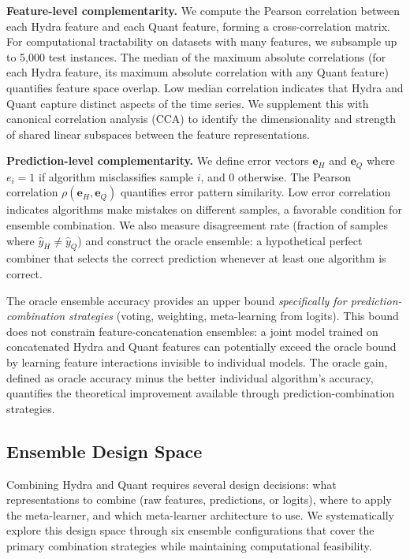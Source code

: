 \documentclass[pdflatex,sn-basic]{sn-jnl}           %
\theoremstyle{thmstyleone}%
\theoremstyle{thmstyletwo}%
\theoremstyle{thmstylethree}%
\begin{document}
\textbf{Feature-level complementarity.} We compute the Pearson correlation between each Hydra feature and each Quant feature, forming a cross-correlation matrix. For computational tractability on datasets with many features, we subsample up to 5,000 test instances. The median of the maximum absolute correlations (for each Hydra feature, its maximum absolute correlation with any Quant feature) quantifies feature space overlap. Low median correlation indicates that Hydra and Quant capture distinct aspects of the time series. We supplement this with canonical correlation analysis (CCA) to identify the dimensionality and strength of shared linear subspaces between the feature representations.

\textbf{Prediction-level complementarity.} We define error vectors $\mathbf{e}_H$ and $\mathbf{e}_Q$ where $e_i = 1$ if algorithm misclassifies sample $i$, and 0 otherwise. The Pearson correlation $\rho(\mathbf{e}_H, \mathbf{e}_Q)$ quantifies error pattern similarity. Low error correlation indicates algorithms make mistakes on different samples, a favorable condition for ensemble combination. We also measure disagreement rate (fraction of samples where $\hat{y}_H \neq \hat{y}_Q$) and construct the oracle ensemble: a hypothetical perfect combiner that selects the correct prediction whenever at least one algorithm is correct.

The oracle ensemble accuracy provides an upper bound \textit{specifically for prediction-combination strategies} (voting, weighting, meta-learning from logits). This bound does not constrain feature-concatenation ensembles: a joint model trained on concatenated Hydra and Quant features can potentially exceed the oracle bound by learning feature interactions invisible to individual models. The oracle gain, defined as oracle accuracy minus the better individual algorithm's accuracy, quantifies the theoretical improvement available through prediction-combination strategies.

\subsection{Ensemble Design Space}\label{subsec:design_space}

Combining Hydra and Quant requires several design decisions: what representations to combine (raw features, predictions, or logits), where to apply the meta-learner, and which meta-learner architecture to use. We systematically explore this design space through six ensemble configurations that cover the primary combination strategies while maintaining computational feasibility.
\end{document}
